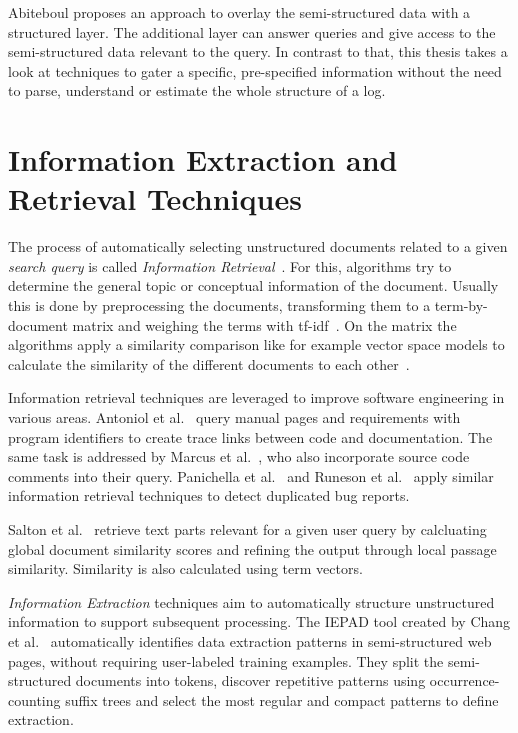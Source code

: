 \documentclass[\myrootdir/main.tex]{subfiles}
\begin{document}
Abiteboul proposes an approach to overlay the semi-structured data with a structured layer.
The additional layer can answer queries and give access to the semi-structured data relevant to the query.
In contrast to that, this thesis takes a look at techniques to gater a specific, pre-specified information without the need to parse, understand or estimate the whole structure of a log.

\section{Information Extraction and Retrieval Techniques}

The process of automatically selecting unstructured documents related to a given \emph{search query} is called \emph{Information Retrieval}~\cite{schutze2008introduction}.
For this, algorithms try to determine the general topic or conceptual information of the document.
Usually this is done by preprocessing the documents, transforming them to a term-by-document matrix and weighing the terms with tf-idf~\cite{lee1997document}.
On the matrix the algorithms apply a similarity comparison like for example vector space models to calculate the similarity of the different documents to each other~\cite{panichella2016parameterizing}.

Information retrieval techniques are leveraged to improve software engineering in various areas.
Antoniol et al.~\cite{antoniol2002recovering} query manual pages and requirements with program identifiers to create trace links between code and documentation.
The same task is addressed by Marcus et al.~\cite{marcus2005recovery}, who also incorporate source code comments into their query.
Panichella et al.~\cite{panichella2016parameterizing} and Runeson et al.~\cite{runeson2007detection} apply similar information retrieval techniques to detect duplicated bug reports.

Salton et al.~\cite{salton1993approaches} retrieve text parts relevant for a given user query by calcluating global document similarity scores and refining the output through local passage similarity.
Similarity is also calculated using term vectors.


\emph{Information Extraction} techniques aim to automatically structure unstructured information to support subsequent processing.
The IEPAD tool created by Chang et al.~\cite{chang2003automatic} automatically identifies data extraction patterns in semi-structured web pages, without requiring user-labeled training examples.
They split the semi-structured documents into tokens, discover repetitive patterns using occurrence-counting suffix trees and select the most regular and compact patterns to define extraction.
\end{document}
